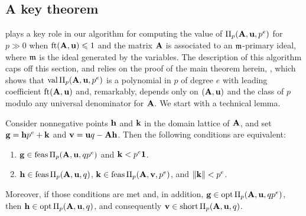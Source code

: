 \documentclass{amsart}
\begin{document}
\subsection{A key theorem}
 plays a key role in our algorithm for computing the value of $\Pi_p(\mathbf{A}, \mathbf{u}, p^e)$ for $p \gg 0$ when $\operatorname{ft}(\mathbf{A}, \mathbf{u}) \leqslant 1$ and the matrix $\mathbf{A}$ is associated to an $\mathfrak{m}$-primary ideal, where $\mathfrak{m}$ is the ideal generated by the variables.
The description of this algorithm caps off this section, and relies on the proof of the main theorem herein, , which shows that $\operatorname{val} \Pi_p(\mathbf{A}, \mathbf{u}, p^e)$ is a polynomial in $p$ of degree $e$ with leading coefficient $\operatorname{ft}(\mathbf{A}, \mathbf{u})$ and, remarkably, depends only on $(\mathbf{A},\mathbf{u})$ and the class of $p$ modulo any universal denominator for $\mathbf{A}$.
We start with a technical lemma.

\begin{lemma}
   \label{general AIP prep: L}
   Consider nonnegative points $\mathbf{h}$ and $\mathbf{k}$ in the domain lattice of $\mathbf{A}$, and set $\mathbf{g} = \mathbf{h} p^e + \mathbf{k}$ and $\mathbf{v} = \mathbf{u}q - \mathbf{A}\mathbf{h}$.
   Then the following conditions are equivalent\textup:
   \begin{enumerate}[$(1)$]
      \item $\mathbf{g} \in \operatorname{feas} \Pi_p(\mathbf{A},\mathbf{u},qp^e)$ and $\mathbf{k} < p^e \mathbf{1}$.
      \item $\mathbf{h} \in \operatorname{feas} \Pi_p(\mathbf{A},\mathbf{u},q)$, $\mathbf{k} \in \operatorname{feas} \Pi_p(\mathbf{A},\mathbf{v},p^e)$, and $\| \mathbf{k} \| < p^e$.
   \end{enumerate}
   Moreover, if those conditions are met and, in addition, $\mathbf{g}\in \operatorname{opt} \Pi_p(\mathbf{A},\mathbf{u},qp^e)$, then $\mathbf{h} \in \operatorname{opt} \Pi_p(\mathbf{A},\mathbf{u},q)$, and consequently $\mathbf{v} \in \operatorname{short} \Pi_p(\mathbf{A},\mathbf{u},q)$.
\end{lemma}
\end{document}
